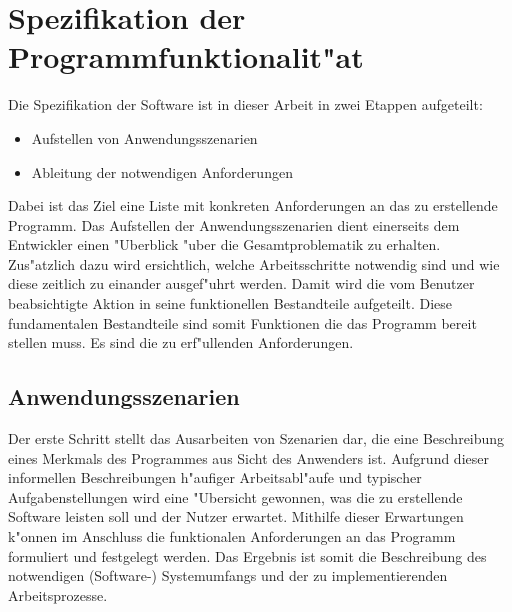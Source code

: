 \chapter{Spezifikation der Programmfunktionalit"at}
\label{chap:spezifikation}

Die Spezifikation der Software ist in dieser Arbeit in zwei Etappen aufgeteilt:
\begin{itemize}
	\item Aufstellen von Anwendungsszenarien
	\item Ableitung der notwendigen Anforderungen
\end{itemize}
Dabei ist das Ziel eine Liste mit konkreten Anforderungen an das zu erstellende Programm.
Das Aufstellen der Anwendungsszenarien dient einerseits dem Entwickler einen "Uberblick "uber die Gesamtproblematik zu erhalten.
Zus"atzlich dazu wird ersichtlich, welche Arbeitsschritte notwendig sind und wie diese zeitlich zu einander ausgef"uhrt werden.
Damit wird die vom Benutzer beabsichtigte Aktion in seine funktionellen Bestandteile aufgeteilt.
Diese fundamentalen Bestandteile sind somit Funktionen die das Programm bereit stellen muss.
Es sind die zu erf"ullenden Anforderungen.

\section{Anwendungsszenarien}
\label{chap:anwendungsszenarien}


Der erste Schritt stellt das Ausarbeiten von Szenarien dar, die eine Beschreibung eines Merkmals des Programmes aus Sicht des Anwenders ist.
Aufgrund dieser informellen Beschreibungen h"aufiger Arbeitsabl"aufe und typischer Aufgabenstellungen wird eine "Ubersicht gewonnen, was die zu erstellende Software leisten soll und der Nutzer erwartet.
Mithilfe dieser Erwartungen k"onnen im Anschluss die funktionalen Anforderungen an das Programm formuliert und festgelegt werden.
Das Ergebnis ist somit die Beschreibung des notwendigen (Software-) Systemumfangs und der zu implementierenden Arbeitsprozesse.


